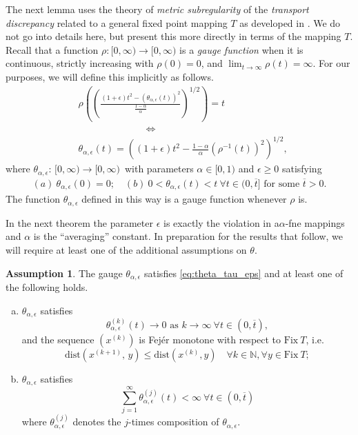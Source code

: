 \documentclass[12pt]{article}
\theoremstyle{definition}
\newtheorem{assumption}{Assumption}
\newcommand{\map}[3]{#1:\,#2\rightarrow #3\,}
\newcommand{\paren}[1]{\left(#1\right)}
\newcommand{\tbar}{{\overline{t}}}
\newcommand{\Nbb}{\mathbb{N}}
\newcommand{\dist}{\mathrm{dist}}
\newcommand{\Fix}{\mathrm{Fix}\ }
\begin{document}
The next lemma uses the theory of {\em metric subregularity} of the {\em transport discrepancy}
related to a general fixed point mapping $T$ as developed in \cite{berdellima2022alpha}.
We do not go into details here, but
present this more directly in terms of the mapping $T$.  Recall that a
function $\rho:[0,\infty) \to [0,\infty)$ is a \textit{gauge function} when it is
continuous, strictly increasing
with $\rho(0)=0$, and $\lim_{t\to \infty}\rho(t)=\infty$.  For our purposes, we
will define this implicitly as follows.
\begin{align}\label{eq:gauge}
& \rho\paren{\paren{\frac{(1+\epsilon)t^2-\paren{\theta_{\alpha,\epsilon}(t)}^2}{\tfrac{1-\alpha}{\alpha}}}^{1/2}}=
 t\\
 &\qquad\qquad\qquad\quad\iff\\
& \theta_{\alpha,\epsilon}(t) = \paren{(1+\epsilon)t^2 - \tfrac{1-\alpha}{\alpha}\paren{\rho^{-1}(t)}^2}^{1/2},
\end{align}
where
$\map{\theta_{\alpha,\epsilon}}{[0,\infty)}{[0,\infty)}$
with parameters $\alpha\in [0,1)$ and $\epsilon\geq 0$ satisfying
\begin{eqnarray}\label{eq:theta_tau_eps}
(a)~ \theta_{\alpha,\epsilon}(0)=0; \quad (b)~ 0<\theta_{\alpha,\epsilon}(t)<t ~\forall t\in(0,\tbar]
\mbox{ for some }\tbar>0.\end{eqnarray}
The function $\theta_{\alpha,\epsilon}$ defined in this way is a gauge function whenever
$\rho$ is.

In the next theorem the parameter $\epsilon$ is
exactly the violation in a$\alpha$-fne mappings and $\alpha$ is the ``averaging'' constant.
In preparation for the results that follow, we will require at least one of the
additional assumptions on $\theta$.
\begin{assumption}\label{a:msr convergence}
The gauge $\theta_{\alpha,\epsilon}$ satisfies \eqref{eq:theta_tau_eps} and
at least one of the following holds.
 \begin{enumerate}[(a)]
\item\label{t:msr convergence, necessary sublin} $\theta_{\alpha,\epsilon}$ satisfies
\begin{equation}\label{eq:theta to zero}
    \theta_{\alpha,\epsilon}^{(k)}(t)\to 0\mbox{ as }k\to\infty~\forall t\in(0,\tbar),
\end{equation}
 and the sequence $(x^{(k)})$ is Fej\'er monotone with respect to $\Fix T$, i.e.
\begin{equation}\label{eq:Fejer}
\dist\paren{x^{(k+1)},\, y}\leq \dist(x^{(k)}, y) \quad \forall k\in\Nbb,
\forall y\in \Fix T;
\end{equation}
\item\label{t:msr convergence, necessary lin+}
$\theta_{\alpha,\epsilon}$ satisfies
\begin{equation}\label{eq:theta summable}
    \sum_{j=1}^\infty\theta_{\alpha,\epsilon}^{(j)}(t)<\infty~\forall t\in(0,\tbar)
\end{equation}
where $\theta_{\alpha,\epsilon}^{(j)}$ denotes the $j$-times composition of $\theta_{\alpha,\epsilon}$.
\end{enumerate}
\end{assumption}
\end{document}
